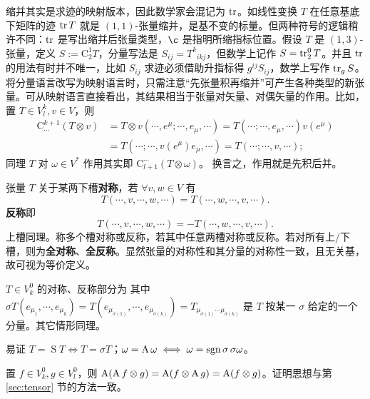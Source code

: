 缩并其实是求迹的映射版本，因此数学家会混记为 $\tr$。如线性变换 $T$ 在任意基底下矩阵的迹 $\tr T$ 就是 $(1,1)$-张量缩并，是基不变的标量。但两种符号的逻辑稍许不同：$\tr$ 是写出缩并后张量类型，$\c$ 是指明所缩指标位置。假设 $T$ 是 $(1,3)$-张量，定义 $S:=\mathrm{C}_2^1T$，分量写法是 $S_{ij}=T^{k}{}_{ikj}$，但数学上记作 $S=\tr^0_2 T$。并且 $\tr$ 的用法有时并不唯一，比如 $S_{ij}$ 求迹必须借助升指标得 $g^{ij}S_{ij}$，数学上写作 $\tr_{g}S$。
将分量语言改写为映射语言时，只需注意“先张量积再缩并”可产生各种类型的新张量。可从映射语言直接看出，其结果相当于张量对矢量、对偶矢量的作用。比如，置 $T \in V^k_l,v \in V$，则
\begin{align*}
    \mathrm{C}_{\cdots}^{k+1}(T \otimes v)&=T \otimes v(\cdots,e^{\mu} ; \cdots,e_{\mu},\cdots)=T(\cdots;\cdots,e_{\mu},\cdots)v(e^\mu)\\
    &=T(\cdots;\cdots,v(e^\mu)e_{\mu},\cdots)=T(\cdots;\cdots,v,\cdots);
\end{align*}
同理 $T$ 对 $\omega\in V^*$ 作用其实即 $\mathrm{C}_{l+1}^{\cdots}(T \otimes \omega)$。
换言之，作用就是先积后并。

\begin{definition}
    张量 $T$ 关于某两下槽\textbf{对称}，若 $\forall v,w\in V$ 有
    \[
    T(\cdots,v,\cdots,w,\cdots)=T(\cdots,w,\cdots,v,\cdots).
    \]
    \textbf{反称}即
    \[
    T(\cdots,v,\cdots,w,\cdots)=-T(\cdots,w,\cdots,v,\cdots).
    \]
    上槽同理。称多个槽对称或反称，若其中任意两槽对称或反称。若对所有上/下槽，则为\textbf{全对称}、\textbf{全反称}。显然张量的对称性和其分量的对称性一致，且无关基，故可视为等价定义。

    $T\in V^0_k$ 的对称、反称部分为
其中 $\sigma T(e_{\mu_1},\cdots,e_{\mu_k})=T(e_{\mu_{\sigma(1)}},\cdots,e_{\mu_{\sigma(k)}})=T_{\mu_{\sigma(1)}\cdots\mu_{\sigma(k)}}$ 是 $T$ 按某一 $\sigma$ 给定的一个分量。其它情形同理。
\end{definition}

\begin{theorem}
    易证 $T=\operatorname{S} T\iff T=\sigma T$；$\omega=\operatorname{A}\omega\iff\omega=\operatorname{sgn}\sigma\,\sigma\omega$。
\end{theorem}

\begin{theorem}
    置 $f\in V^0_k,g\in V^0_l$，则 $\operatorname{A}(\operatorname{A} f\otimes g)=\operatorname{A}(f\otimes\operatorname{A} g)=\operatorname{A}(f\otimes g)$。证明思想与第 \ref{sec:tensor} 节的方法一致。
\end{theorem}

